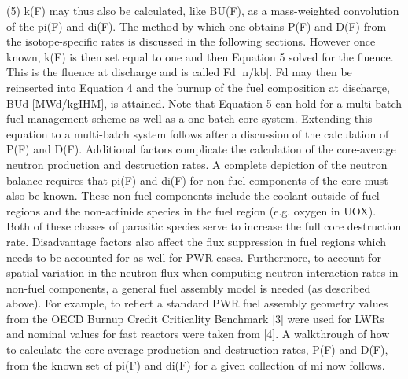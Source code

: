                                                   (5)
k(F) may thus also be calculated, like BU(F), as a mass-weighted convolution of the pi(F) and di(F).  The method by which one obtains P(F) and D(F) from the isotope-specific rates is discussed in the following sections.  However once known, k(F) is then set equal to one and then Equation 5 solved for the fluence.  This is the fluence at discharge and is called Fd [n/kb].  Fd may then be reinserted into Equation 4 and the burnup of the fuel composition at discharge, BUd [MWd/kgIHM], is attained.
Note that Equation 5 can hold for a multi-batch fuel management scheme as well as a one batch core system.  Extending this equation to a multi-batch system follows after a discussion of the calculation of P(F) and D(F).
Additional factors complicate the calculation of the core-average neutron production and destruction rates.  A complete depiction of the neutron balance requires that pi(F) and di(F) for non-fuel components of the core must also be known.  These non-fuel components include the coolant outside of fuel regions and the non-actinide species in the fuel region (e.g. oxygen in UOX).  Both of these classes of parasitic species serve to increase the full core destruction rate.  Disadvantage factors also affect the flux suppression in fuel regions which needs to be accounted for as well for PWR cases.  Furthermore, to account for spatial variation in the neutron flux when computing neutron interaction rates in non-fuel components, a general fuel assembly model is needed (as described above).  For example, to reflect a standard PWR fuel assembly geometry values from the OECD Burnup Credit Criticality Benchmark [3] were used for LWRs and nominal values for fast reactors were taken from [4].  A walkthrough of how to calculate the core-average production and destruction rates, P(F) and D(F), from the known set of pi(F) and di(F) for a given collection of mi now follows.  

